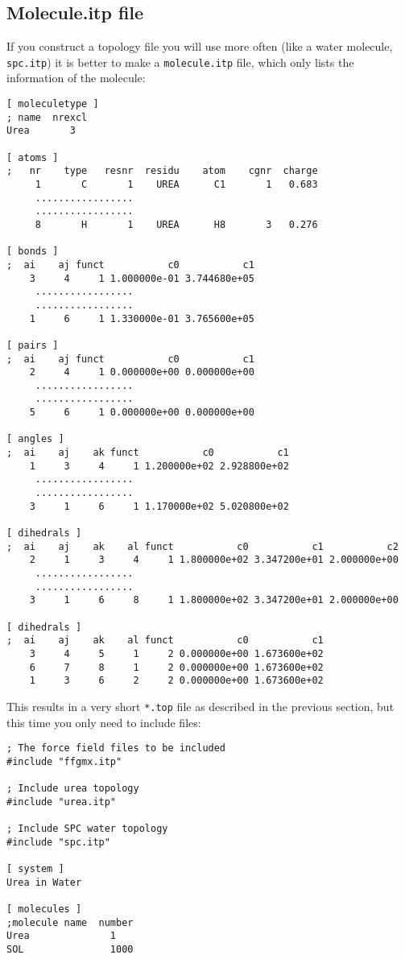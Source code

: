 \subsection{Molecule.itp file}
\label{subsec:molitp}
If you construct a topology file you will use more often (like a water
molecule, {\tt spc.itp}) it is better to make a \verb'molecule.itp'
file, which only lists the information of the molecule: 
{\small\begin{verbatim}
[ moleculetype ]
; name  nrexcl
Urea       3

[ atoms ]
;   nr    type   resnr  residu    atom    cgnr  charge
     1       C       1    UREA      C1       1	 0.683	
     .................
     .................
     8       H       1    UREA      H8       3	 0.276

[ bonds ]
;  ai    aj funct           c0           c1
    3     4     1 1.000000e-01 3.744680e+05 
     .................
     .................
    1     6     1 1.330000e-01 3.765600e+05 

[ pairs ]
;  ai    aj funct           c0           c1
    2     4     1 0.000000e+00 0.000000e+00 
     .................
     .................
    5     6     1 0.000000e+00 0.000000e+00 

[ angles ]
;  ai    aj    ak funct           c0           c1
    1     3     4     1 1.200000e+02 2.928800e+02 
     .................
     .................
    3     1     6     1 1.170000e+02 5.020800e+02 

[ dihedrals ]
;  ai    aj    ak    al funct           c0           c1           c2
    2     1     3     4     1 1.800000e+02 3.347200e+01 2.000000e+00 
     .................
     .................
    3     1     6     8     1 1.800000e+02 3.347200e+01 2.000000e+00 

[ dihedrals ]
;  ai    aj    ak    al funct           c0           c1
    3     4     5     1     2 0.000000e+00 1.673600e+02 
    6     7     8     1     2 0.000000e+00 1.673600e+02 
    1     3     6     2     2 0.000000e+00 1.673600e+02 
\end{verbatim}
}
This results in a very short \verb'*.top' file as described in the
previous section, but this time you only need to include files:
{\small\begin{verbatim}
; The force field files to be included
#include "ffgmx.itp"
	
; Include urea topology
#include "urea.itp"

; Include SPC water topology
#include "spc.itp"

[ system ]
Urea in Water

[ molecules ]
;molecule name  number
Urea              1
SOL               1000
\end{verbatim}}

